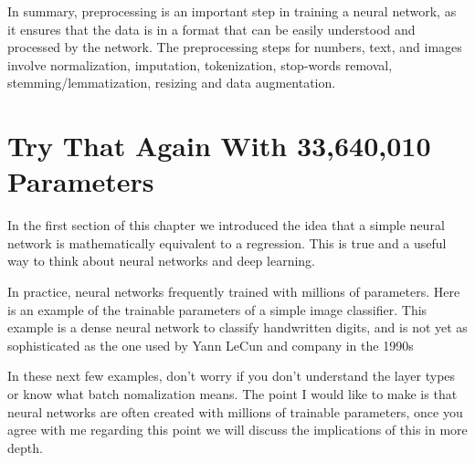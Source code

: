 In summary, preprocessing is an important step in training a neural network, as it ensures that the data is in a format that can be easily understood and processed by the network. The preprocessing steps for numbers, text, and images involve normalization, imputation, tokenization, stop-words removal, stemming/lemmatization, resizing and data augmentation.

\section{Try That Again With 33,640,010 Parameters}

In the first section of this chapter we introduced the idea that a simple neural network is mathematically equivalent to a regression. This is true and a useful way to think about neural networks and deep learning.  

In practice, neural networks frequently trained with millions of parameters. Here is an example of the trainable parameters of a simple image classifier. This example is a dense neural network to classify handwritten digits, and is not yet as sophisticated as the one used by Yann LeCun and company in the 1990s

In these next few examples, don't worry if you don't understand the layer types or know what batch nomalization means. The point I would like to make is that neural networks are often created with millions of trainable parameters, once you agree with me regarding this point we will discuss the implications of this in more depth.


